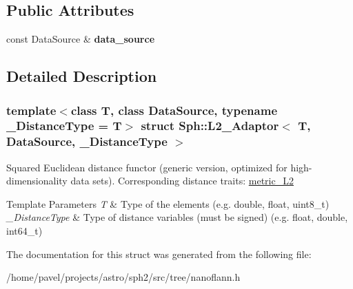 \subsection*{Public Attributes}
\begin{DoxyCompactItemize}
\item 
\hypertarget{structSph_1_1L2__Adaptor_a5f1cd9320d19106d7c188986560cb650}{}\label{structSph_1_1L2__Adaptor_a5f1cd9320d19106d7c188986560cb650} 
const Data\+Source \& {\bfseries data\+\_\+source}
\end{DoxyCompactItemize}


\subsection{Detailed Description}
\subsubsection*{template$<$class T, class Data\+Source, typename \+\_\+\+Distance\+Type = T$>$\newline
struct Sph\+::\+L2\+\_\+\+Adaptor$<$ T, Data\+Source, \+\_\+\+Distance\+Type $>$}

Squared Euclidean distance functor (generic version, optimized for high-\/dimensionality data sets). Corresponding distance traits\+: \hyperlink{structSph_1_1metric__L2}{metric\+\_\+\+L2} 
\begin{DoxyTemplParams}{Template Parameters}
{\em T} & Type of the elements (e.\+g. double, float, uint8\+\_\+t) \\
\hline
{\em \+\_\+\+Distance\+Type} & Type of distance variables (must be signed) (e.\+g. float, double, int64\+\_\+t) \\
\hline
\end{DoxyTemplParams}


The documentation for this struct was generated from the following file\+:\begin{DoxyCompactItemize}
\item 
/home/pavel/projects/astro/sph2/src/tree/nanoflann.\+h\end{DoxyCompactItemize}
